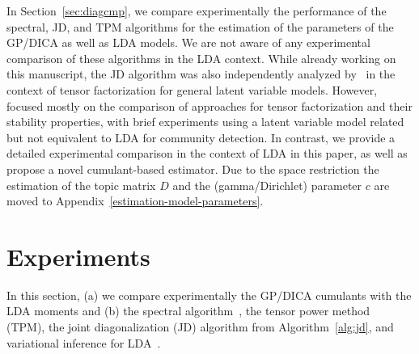 \documentclass{article}
\begin{document}
In Section~\ref{sec:diagcmp}, we compare experimentally the performance of the spectral, JD, and TPM algorithms for the estimation of the parameters of the GP/DICA as well as LDA models. We are not aware of any experimental comparison of these algorithms in the LDA context. 
While already working on this manuscript, the JD algorithm was also independently analyzed by~\cite{KulEtAl2015} in the context of tensor factorization for general latent variable models.
However,~\cite{KulEtAl2015} focused mostly on the comparison of approaches for tensor factorization and their stability properties, with brief experiments using a latent variable model related but not equivalent to LDA for community detection. 
In contrast, we provide a detailed experimental comparison in the context of LDA in this paper, as well as propose a novel cumulant-based estimator.
Due to the space restriction 
the estimation of the topic matrix $D$ and the (gamma/Dirichlet) parameter $c$ are moved to  Appendix~\ref{estimation-model-parameters}.




















































\section{Experiments}\label{sec:exps}
In this section, (a) we compare experimentally the GP/DICA cumulants with the LDA moments and (b)
the spectral algorithm~\cite{AnaEtAl2012}, the tensor power method~\cite{AnaEtAl2014} (TPM), the joint diagonalization (JD) algorithm from Algorithm~\ref{alg:jd},
 and variational inference for LDA~\cite{BleEtAl2003}.
\end{document}
